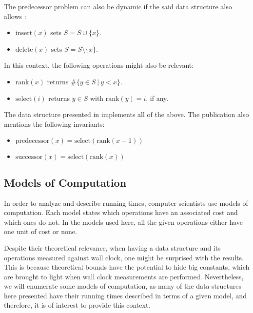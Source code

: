 The predecessor problem can also be dynamic if the said data structure also allows \cite{beame1999optimal}:
\begin{itemize}
    \item
    $\text{insert}(x)$ sets $S=S \cup \{x\}$.
    
    \item
    $\text{delete}(x)$ sets $S=S \setminus \{x\}$.
\end{itemize}

In this context, the following operations might also be relevant:
\begin{itemize}
    \item
    $\text{rank}(x)$ returns $\#\{ y \in S\ |\ y < x\}$.
    \item
    $\text{select}(i)$ returns $y \in S$ with $\text{rank}(y) = i$, if any.
\end{itemize}

The data structure presented in \cite{patrascu2014dynamic} implements all of the above. The publication also mentions the following invariants:
\begin{itemize}
    \item
    $\text{predecessor}(x) = \text{select}(\text{rank}(x - 1))$
    \item
    $\text{successor}(x) = \text{select}(\text{rank}(x))$
\end{itemize}

\subsection{Models of Computation} \label{sec:modelsofcomputation}

In order to analyze and describe running times, computer scientists use models of computation. Each model states which operations have an associated cost and which ones do not.
In the models used here, all the given operations either have one unit of cost or none.

Despite their theoretical relevance, when having a data structure and its operations measured against wall clock, one might be surprised with the results.
This is because theoretical bounds have the potential to hide big constants, which are brought to light when wall clock measurements are performed.
Nevertheless, we will enumerate some models of computation, as many of the data structures here presented have their running times described in terms of a given model, and therefore, it is of interest to provide this context.

